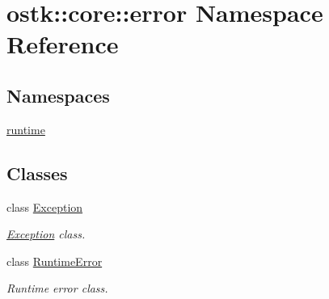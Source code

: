 \hypertarget{namespaceostk_1_1core_1_1error}{}\section{ostk\+:\+:core\+:\+:error Namespace Reference}
\label{namespaceostk_1_1core_1_1error}
\subsection*{Namespaces}
\begin{DoxyCompactItemize}
\item 
 \hyperlink{namespaceostk_1_1core_1_1error_1_1runtime}{runtime}
\end{DoxyCompactItemize}
\subsection*{Classes}
\begin{DoxyCompactItemize}
\item 
class \hyperlink{classostk_1_1core_1_1error_1_1_exception}{Exception}
\begin{DoxyCompactList}\small\item\em \hyperlink{classostk_1_1core_1_1error_1_1_exception}{Exception} class. \end{DoxyCompactList}\item 
class \hyperlink{classostk_1_1core_1_1error_1_1_runtime_error}{Runtime\+Error}
\begin{DoxyCompactList}\small\item\em Runtime error class. \end{DoxyCompactList}\end{DoxyCompactItemize}
